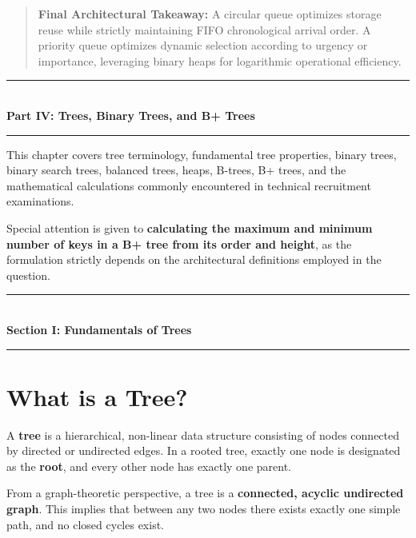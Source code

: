 \begin{quote}
\textbf{Final Architectural Takeaway:} A circular queue optimizes storage reuse while strictly maintaining FIFO chronological arrival order. A priority queue optimizes dynamic selection according to urgency or importance, leveraging binary heaps for logarithmic operational efficiency.
\end{quote}


\begin{center}
\vspace{1em}
{\color{primary}\rule{0.5\textwidth}{1.5pt}}\\[6pt]
{\Large\bfseries\color{primary} Part IV: Trees, Binary Trees, and B+ Trees}\\[3pt]
{\color{primary}\rule{0.5\textwidth}{1.5pt}}
\vspace{1em}
\end{center}

This chapter covers tree terminology, fundamental tree properties, binary trees, binary search trees, balanced trees, heaps, B-trees, B+ trees, and the mathematical calculations commonly encountered in technical recruitment examinations.

Special attention is given to \textbf{calculating the maximum and minimum number of keys in a B+ tree from its order and height}, as the formulation strictly depends on the architectural definitions employed in the question.

\begin{center}
\vspace{0.5em}
{\color{primary}\rule{0.45\textwidth}{1.2pt}}\\[4pt]
{\Large\bfseries\color{primary} Section I: Fundamentals of Trees}\\[2pt]
{\color{primary}\rule{0.45\textwidth}{1.2pt}}
\vspace{0.5em}
\end{center}

\section{What is a Tree?}

A \textbf{tree} is a hierarchical, non-linear data structure consisting of nodes connected by directed or undirected edges. In a rooted tree, exactly one node is designated as the \textbf{root}, and every other node has exactly one parent.

From a graph-theoretic perspective, a tree is a \textbf{connected, acyclic undirected graph}. This implies that between any two nodes there exists exactly one simple path, and no closed cycles exist.

